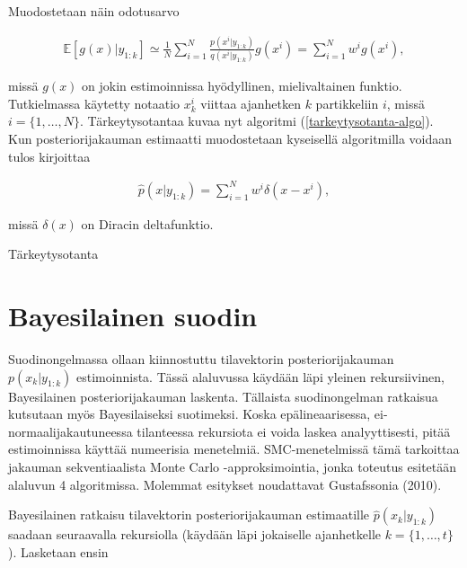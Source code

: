 \documentclass[
  12pt,
  a4paper, twoside]{book}
\begin{document}
Muodostetaan näin odotusarvo

\begin{align}
\mathbb{E}[g(x)|y_{1:k}]\simeq\frac{1}{N}\sum_{i=1}^N\frac{p(x^i|y_{1:k})}{q(x^i|y_{1:k})}g(x^i)=\sum_{i=1}^Nw^ig(x^i),
\end{align}

\noindent missä \(g(x)\) on jokin estimoinnissa hyödyllinen, mielivaltainen funktio. Tutkielmassa käytetty notaatio \(x_k^i\) viittaa ajanhetken \(k\) partikkeliin \(i\), missä \(i=\{1,\ldots,N\}\). Tärkeytysotantaa kuvaa nyt algoritmi (\ref{tarkeytysotanta-algo}). Kun posteriorijakauman estimaatti muodostetaan kyseisellä algoritmilla voidaan tulos kirjoittaa

\begin{align}
\hat{p}(x|y_{1:k})=\sum_{i=1}^{N}w^i \delta(x-x^i),
\end{align}

\noindent missä \(\delta(x)\) on Diracin deltafunktio.

\begin{algorithm}[H]
\label{tarkeytysotanta-algo}
\DontPrintSemicolon
{}  
\caption{Tärkeytysotanta}
\end{algorithm}

\section{Bayesilainen suodin}

Suodinongelmassa ollaan kiinnostuttu tilavektorin posteriorijakauman \(p(x_k|y_{1:k})\) estimoinnista. Tässä alaluvussa käydään läpi yleinen rekursiivinen, Bayesilainen posteriorijakauman laskenta. Tällaista suodinongelman ratkaisua kutsutaan myös Bayesilaiseksi suotimeksi. Koska epälineaarisessa, ei-normaalijakautuneessa tilanteessa rekursiota ei voida laskea analyyttisesti, pitää estimoinnissa käyttää numeerisia menetelmiä. SMC-menetelmissä tämä tarkoittaa jakauman sekventiaalista Monte Carlo -approksimointia, jonka toteutus esitetään alaluvun 4 algoritmissa. Molemmat esitykset noudattavat Gustafssonia (2010).

Bayesilainen ratkaisu tilavektorin posteriorijakauman estimaatille \(\hat{p}(x_k|y_{1:k})\) saadaan seuraavalla rekursiolla (käydään läpi jokaiselle ajanhetkelle \(k=\{1,\ldots,t\}\)). Lasketaan ensin
\end{document}
